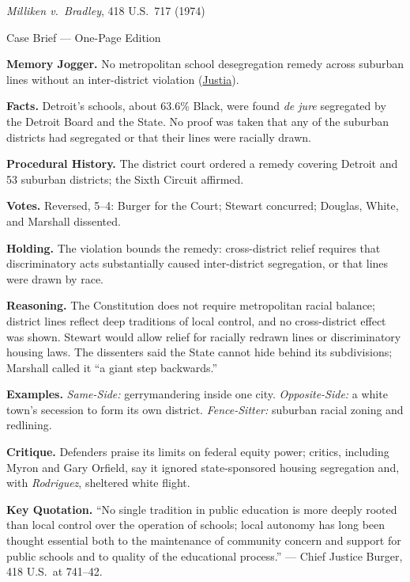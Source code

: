 \documentclass[12pt]{article}
\begin{document}
\begin{center}
{\Large \textit{Milliken v.\ Bradley}, 418 U.S.\ 717 (1974)\par}
\vspace{0.3em}
{\normalsize Case Brief --- One-Page Edition\par}
\end{center}

\textbf{Memory Jogger.} No metropolitan school desegregation remedy across suburban lines without an inter-district violation (\href{https://supreme.justia.com/cases/federal/us/418/717/}{Justia}).

\textbf{Facts.} Detroit's schools, about 63.6\% Black, were found \textit{de jure} segregated by the Detroit Board and the State. No proof was taken that any of the suburban districts had segregated or that their lines were racially drawn.

\textbf{Procedural History.} The district court ordered a remedy covering Detroit and 53 suburban districts; the Sixth Circuit affirmed.

\textbf{Votes.} Reversed, 5--4: Burger for the Court; Stewart concurred; Douglas, White, and Marshall dissented.

\textbf{Holding.} The violation bounds the remedy: cross-district relief requires that discriminatory acts substantially caused inter-district segregation, or that lines were drawn by race.

\textbf{Reasoning.} The Constitution does not require metropolitan racial balance; district lines reflect deep traditions of local control, and no cross-district effect was shown. Stewart would allow relief for racially redrawn lines or discriminatory housing laws. The dissenters said the State cannot hide behind its subdivisions; Marshall called it ``a giant step backwards.''

\textbf{Examples.} \emph{Same-Side:} gerrymandering inside one city. \emph{Opposite-Side:} a white town's secession to form its own district. \emph{Fence-Sitter:} suburban racial zoning and redlining.

\textbf{Critique.} Defenders praise its limits on federal equity power; critics, including Myron and Gary Orfield, say it ignored state-sponsored housing segregation and, with \textit{Rodriguez}, sheltered white flight.

\textbf{Key Quotation.} ``No single tradition in public education is more deeply rooted than local control over the operation of schools; local autonomy has long been thought essential both to the maintenance of community concern and support for public schools and to quality of the educational process.'' --- Chief Justice Burger, 418 U.S.\ at 741--42.
\end{document}
